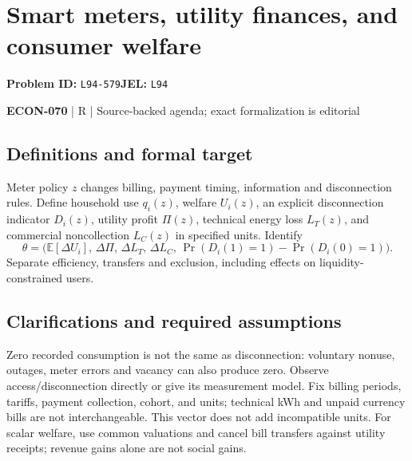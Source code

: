 \documentclass[11pt,a4paper]{article}
\begin{document}
\section*{Smart meters, utility finances, and consumer welfare}
\textbf{Problem ID:} \texttt{L94-579}\quad \textbf{JEL:} \texttt{L94}\par
\label{problem:OP-0638}


\label{audited:ECON-070}

{\sffamily\small\color{muted}\textbf{ECON-070} | R | Source-backed agenda; exact formalization is editorial\par}

\subsection*{Definitions and formal target}

Meter policy \(z\) changes billing, payment timing, information and disconnection rules. Define household use \(q_i(z)\), welfare \(U_i(z)\), an explicit disconnection indicator \(D_i(z)\), utility profit \(\Pi(z)\), technical energy loss \(L_T(z)\), and commercial noncollection \(L_C(z)\) in specified units. Identify
\[
 \theta=\bigl(\mathbb E[\Delta U_i],\,\Delta\Pi,\,\Delta L_T,\,
                    \Delta L_C,\,\Pr(D_i(1)=1)-\Pr(D_i(0)=1)\bigr).
\]
Separate efficiency, transfers and exclusion, including effects on liquidity-constrained users.

\subsection*{Clarifications and required assumptions}

Zero recorded consumption is not the same as disconnection: voluntary nonuse, outages, meter errors and vacancy can also produce zero. Observe access/disconnection directly or give its measurement model. Fix billing periods, tariffs, payment collection, cohort, and units; technical kWh and unpaid currency bills are not interchangeable. This vector does not add incompatible units. For scalar welfare, use common valuations and cancel bill transfers against utility receipts; revenue gains alone are not social gains.
\end{document}
